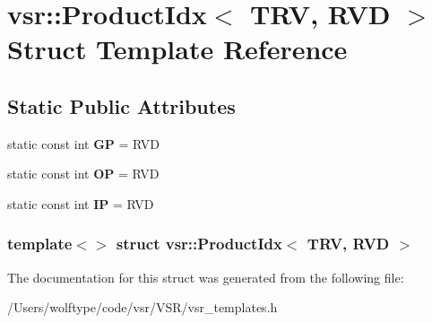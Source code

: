 \hypertarget{structvsr_1_1_product_idx_3_01_t_r_v_00_01_r_v_d_01_4}{\section{vsr\-:\-:Product\-Idx$<$ T\-R\-V, R\-V\-D $>$ Struct Template Reference}
\label{structvsr_1_1_product_idx_3_01_t_r_v_00_01_r_v_d_01_4}
}
\subsection*{Static Public Attributes}
\begin{DoxyCompactItemize}
\item 
\hypertarget{structvsr_1_1_product_idx_3_01_t_r_v_00_01_r_v_d_01_4_ab9bd01e7495ce52e659b0fb7e6e8a9f7}{static const int {\bfseries G\-P} = R\-V\-D}\label{structvsr_1_1_product_idx_3_01_t_r_v_00_01_r_v_d_01_4_ab9bd01e7495ce52e659b0fb7e6e8a9f7}

\item 
\hypertarget{structvsr_1_1_product_idx_3_01_t_r_v_00_01_r_v_d_01_4_af4e6b7a5372e63ac452659822a0d93a4}{static const int {\bfseries O\-P} = R\-V\-D}\label{structvsr_1_1_product_idx_3_01_t_r_v_00_01_r_v_d_01_4_af4e6b7a5372e63ac452659822a0d93a4}

\item 
\hypertarget{structvsr_1_1_product_idx_3_01_t_r_v_00_01_r_v_d_01_4_acbfbd816ed0130aaf9c7431edccb101a}{static const int {\bfseries I\-P} = R\-V\-D}\label{structvsr_1_1_product_idx_3_01_t_r_v_00_01_r_v_d_01_4_acbfbd816ed0130aaf9c7431edccb101a}

\end{DoxyCompactItemize}
\subsubsection*{template$<$$>$ struct vsr\-::\-Product\-Idx$<$ T\-R\-V, R\-V\-D $>$}



The documentation for this struct was generated from the following file\-:\begin{DoxyCompactItemize}
\item 
/\-Users/wolftype/code/vsr/\-V\-S\-R/vsr\-\_\-templates.\-h\end{DoxyCompactItemize}

